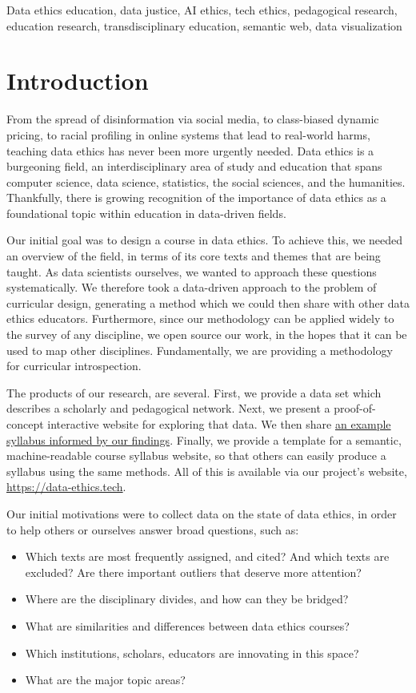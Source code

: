 \documentclass[
]{article}
\providecommand{\tightlist}{%
  \setlength{\itemsep}{0pt}\setlength{\parskip}{0pt}}
\begin{document}
Data ethics education, data justice, AI ethics, tech ethics, pedagogical
research, education research, transdisciplinary education, semantic web,
data visualization

\hypertarget{introduction}{%
\section{Introduction}\label{introduction}}

From the spread of disinformation via social media, to class-biased
dynamic pricing, to racial profiling in online systems that lead to
real-world harms, teaching data ethics has never been more urgently
needed. Data ethics is a burgeoning field, an interdisciplinary area of
study and education that spans computer science, data science,
statistics, the social sciences, and the humanities. Thankfully, there
is growing recognition of the importance of data ethics as a
foundational topic within education in data-driven fields.

Our initial goal was to design a course in data ethics. To achieve this,
we needed an overview of the field, in terms of its core texts and
themes that are being taught. As data scientists ourselves, we wanted to
approach these questions systematically. We therefore took a data-driven
approach to the problem of curricular design, generating a method which
we could then share with other data ethics educators. Furthermore, since
our methodology can be applied widely to the survey of any discipline,
we open source our work, in the hopes that it can be used to map other
disciplines. Fundamentally, we are providing a methodology for
curricular introspection.

The products of our research, are several. First, we provide a data set
which describes a scholarly and pedagogical network. Next, we present a
proof-of-concept interactive website for exploring that data. We then
share \href{http://data-ethics.jonreeve.com/}{an example syllabus
informed by our findings}. Finally, we provide a template for a
semantic, machine-readable course syllabus website, so that others can
easily produce a syllabus using the same methods. All of this is
available via our project's website, \url{https://data-ethics.tech}.

Our initial motivations were to collect data on the state of data
ethics, in order to help others or ourselves answer broad questions,
such as:

\begin{itemize}
\tightlist
\item
  Which texts are most frequently assigned, and cited? And which texts
  are excluded? Are there important outliers that deserve more
  attention?
\item
  Where are the disciplinary divides, and how can they be bridged?
\item
  What are similarities and differences between data ethics courses?
\item
  Which institutions, scholars, educators are innovating in this space?
\item
  What are the major topic areas?
\end{itemize}
\end{document}
